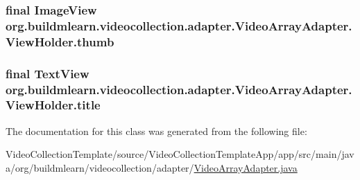 \subsubsection[{\texorpdfstring{thumb}{thumb}}]{\setlength{\rightskip}{0pt plus 5cm}final Image\+View org.\+buildmlearn.\+videocollection.\+adapter.\+Video\+Array\+Adapter.\+View\+Holder.\+thumb}\hypertarget{classorg_1_1buildmlearn_1_1videocollection_1_1adapter_1_1VideoArrayAdapter_1_1ViewHolder_a1cd95c3d5dde5b650697ff22ab29d774}{}\label{classorg_1_1buildmlearn_1_1videocollection_1_1adapter_1_1VideoArrayAdapter_1_1ViewHolder_a1cd95c3d5dde5b650697ff22ab29d774}
\subsubsection[{\texorpdfstring{title}{title}}]{\setlength{\rightskip}{0pt plus 5cm}final Text\+View org.\+buildmlearn.\+videocollection.\+adapter.\+Video\+Array\+Adapter.\+View\+Holder.\+title}\hypertarget{classorg_1_1buildmlearn_1_1videocollection_1_1adapter_1_1VideoArrayAdapter_1_1ViewHolder_a2bd0a50f4c29e314d0a8302683593aec}{}\label{classorg_1_1buildmlearn_1_1videocollection_1_1adapter_1_1VideoArrayAdapter_1_1ViewHolder_a2bd0a50f4c29e314d0a8302683593aec}


The documentation for this class was generated from the following file\+:\begin{DoxyCompactItemize}
\item 
Video\+Collection\+Template/source/\+Video\+Collection\+Template\+App/app/src/main/java/org/buildmlearn/videocollection/adapter/\hyperlink{VideoArrayAdapter_8java}{Video\+Array\+Adapter.\+java}\end{DoxyCompactItemize}
